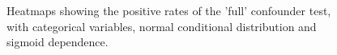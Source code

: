 \begin{figure}[H]
  \centering
  \caption{Heatmaps showing the positive rates of the 'full' confounder test, with categorical variables, normal conditional distribution and sigmoid dependence.}
  \label{fig:sim-bbb-sig-full}
\end{figure}

